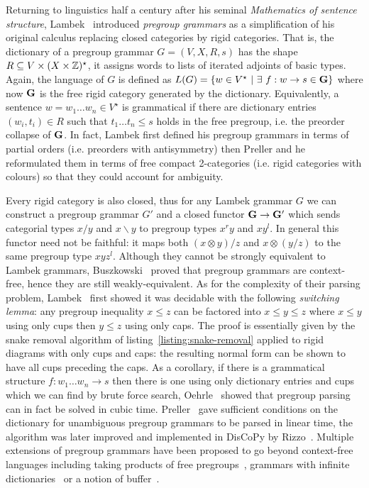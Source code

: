 Returning to linguistics half a century after his seminal \emph{Mathematics of sentence structure}, Lambek~\cite{Lambek99,Lambek01,Lambek08} introduced \emph{pregroup grammars} as a simplification of his original calculus replacing closed categories by rigid categories.
That is, the dictionary of a pregroup grammar $G = (V, X, R, s)$ has the shape $R \subseteq V \times (X \times \mathbb{Z})^\star$, it assigns words to lists of iterated adjoints of basic types.
Again, the language of $G$ is defined as $L(G) = \{ w \in V^\star \ \vert \ \exists \ f : w \to s \in \mathbf{G} \}$ where now $\mathbf{G}$ is the free rigid category generated by the dictionary.
Equivalently, a sentence $w = w_1 \dots w_n \in V^\star$ is grammatical if there are dictionary entries $(w_i, t_i) \in R$ such that $t_1 \dots t_n \leq s$ holds in the free pregroup, i.e. the preorder collapse of $\mathbf{G}$.
In fact, Lambek first defined his pregroup grammars in terms of partial orders (i.e. preorders with antisymmetry) then Preller and he~\cite{PrellerLambek07} reformulated them in terms of free compact 2-categories (i.e. rigid categories with colours) so that they could account for ambiguity.

Every rigid category is also closed, thus for any Lambek grammar $G$ we can construct a pregroup grammar $G'$ and a closed functor $\mathbf{G} \to \mathbf{G}'$ which sends categorial types $x / y$ and $x \backslash y$ to pregroup types $x^r y$ and $x y^l$.
In general this functor need not be faithful: it maps both $(x \otimes y) / z$ and $x \otimes (y / z)$ to the same pregroup type $x y z^l$.
Although they cannot be strongly equivalent to Lambek grammars, Buszkowski~\cite{Buszkowski01} proved that pregroup grammars are context-free, hence they are still weakly-equivalent.
As for the complexity of their parsing problem, Lambek~\cite{Lambek99} first showed it was decidable with the following \emph{switching lemma}: any pregroup inequality $x \leq z$ can be factored into $x \leq y \leq z$ where $x \leq y$ using only cups then $y \leq z$ using only caps.
The proof is essentially given by the snake removal algorithm of listing~\ref{listing:snake-removal} applied to rigid diagrams with only cups and caps: the resulting normal form can be shown to have all cups preceding the caps.
As a corollary, if there is a grammatical structure $f : w_1 \dots w_n \to s$ then there is one using only dictionary entries and cups which we can find by brute force search, Oehrle~\cite{Oehrle04} showed that pregroup parsing can in fact be solved in cubic time.
Preller~\cite{Preller07a} gave sufficient conditions on the dictionary for unambiguous pregroup grammars to be parsed in linear time, the algorithm was later improved and implemented in DisCoPy by Rizzo~\cite{Rizzo21}.
Multiple extensions of pregroup grammars have been proposed to go beyond context-free languages including taking products of free pregroups~\cite[Section~28]{Lambek08}, grammars with infinite dictionaries~\cite{Preller10} or a notion of buffer~\cite{GenkinEtAl10}.

